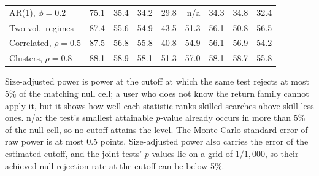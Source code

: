 \begin{table}[t]
\begin{tabular}{lrrrrrrrr}
AR(1), $\phi=0.2$ & 75.1 & 35.4 & 34.2 & 29.8 & n/a & 34.3 & 34.8 & 32.4 \\
Two vol.\ regimes & 87.4 & 55.6 & 54.9 & 43.5 & 51.3 & 56.1 & 50.8 & 56.5 \\
Correlated, $\rho=0.5$ & 87.5 & 56.8 & 55.8 & 40.8 & 54.9 & 56.1 & 56.9 & 54.2 \\
Clusters, $\rho=0.8$ & 88.1 & 58.9 & 58.1 & 51.3 & 57.0 & 58.1 & 58.7 & 55.8 \\
\bottomrule
\end{tabular}
\par
\par\smallskip\begin{minipage}{0.97\linewidth}\footnotesize Size-adjusted power is power at the cutoff at which the same test rejects at most 5\% of the matching null cell; a user who does not know the return family cannot apply it, but it shows how well each statistic ranks skilled searches above skill-less ones. n/a: the test's smallest attainable $p$-value already occurs in more than 5\% of the null cell, so no cutoff attains the level. The Monte Carlo standard error of raw power is at most 0.5 points. Size-adjusted power also carries the error of the estimated cutoff, and the joint tests' $p$-values lie on a grid of $1/1{,}000$, so their achieved null rejection rate at the cutoff can be below 5\%.\end{minipage}
\end{table}

